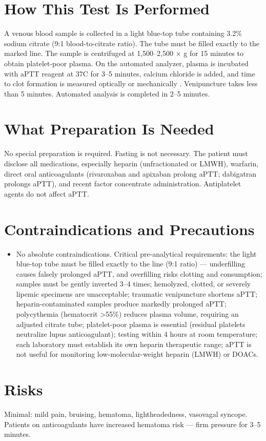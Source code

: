\section*{How This Test Is Performed}
A venous blood sample is collected in a light blue-top tube containing 3.2\% sodium citrate (9:1 blood-to-citrate ratio). The tube must be filled exactly to the marked line. The sample is centrifuged at 1,500--2,500 $\times$ g for 15 minutes to obtain platelet-poor plasma. On the automated analyzer, plasma is incubated with aPTT reagent at 37\textdegree{}C for 3--5 minutes, calcium chloride is added, and time to clot formation is measured optically or mechanically \cite{fischbach2023manual}. Venipuncture takes less than 5 minutes. Automated analysis is completed in 2--5 minutes.

\section*{What Preparation Is Needed}
No special preparation is required. Fasting is not necessary. The patient must disclose all medications, especially heparin (unfractionated or LMWH), warfarin, direct oral anticoagulants (rivaroxaban and apixaban prolong aPTT; dabigatran prolongs aPTT), and recent factor concentrate administration. Antiplatelet agents do not affect aPTT.

\section*{Contraindications and Precautions}
\begin{itemize}
  \item No absolute contraindications. Critical pre-analytical requirements: the light blue-top tube must be filled exactly to the line (9:1 ratio) --- underfilling causes falsely prolonged aPTT, and overfilling risks clotting and consumption; samples must be gently inverted 3--4 times; hemolyzed, clotted, or severely lipemic specimens are unacceptable; traumatic venipuncture shortens aPTT; heparin-contaminated samples produce markedly prolonged aPTT; polycythemia (hematocrit >55\%) reduces plasma volume, requiring an adjusted citrate tube; platelet-poor plasma is essential (residual platelets neutralize lupus anticoagulant); testing within 4 hours at room temperature; each laboratory must establish its own heparin therapeutic range; aPTT is not useful for monitoring low-molecular-weight heparin (LMWH) or DOACs.
\end{itemize}
\section*{Risks}
Minimal: mild pain, bruising, hematoma, lightheadedness, vasovagal syncope. Patients on anticoagulants have increased hematoma risk --- firm pressure for 3--5 minutes.

